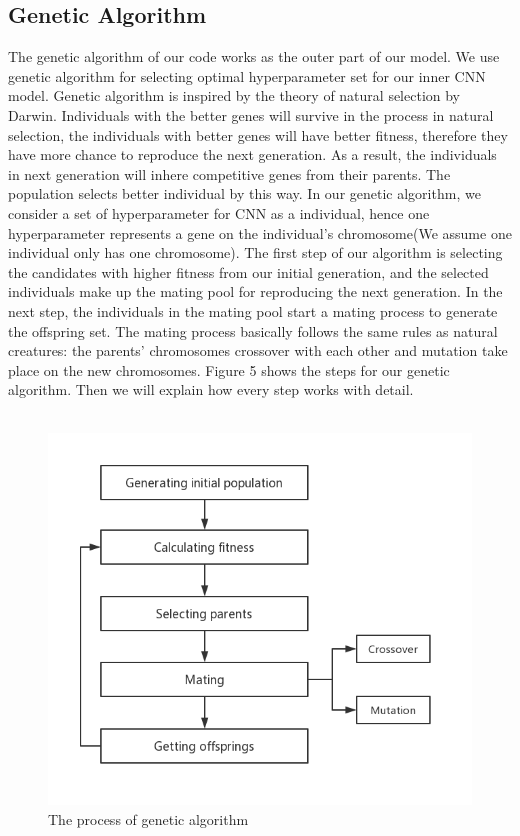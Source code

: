 \documentclass[12pt]{article}
\begin{document}
\subsection{Genetic Algorithm}
The genetic algorithm of our code works as the outer part of our model. We use genetic algorithm for selecting optimal hyperparameter set for our inner CNN model. Genetic algorithm is inspired by the theory of natural selection by Darwin. Individuals with the better genes will survive in the process in natural selection, the individuals with better genes will have better fitness, therefore they have more chance to reproduce the next generation. As a result, the individuals in next generation will inhere competitive genes from their parents. The population selects better individual by this way. In our genetic algorithm, we consider a set of hyperparameter for CNN as a individual, hence one hyperparameter represents a gene on the individual's chromosome(We assume one individual only has one chromosome). The first step of our algorithm is selecting the candidates with higher fitness from our initial generation, and the selected individuals make up the mating pool for reproducing the next generation. In the next step, the individuals in the mating pool start a mating process to generate the offspring set. The mating process basically follows the same rules as natural creatures: the parents' chromosomes crossover with each other and mutation take place on the new chromosomes. Figure 5 shows the steps for our genetic algorithm. Then we will explain how every step works with detail.\\
~\\
\begin{figure}
\begin{center}
\includegraphics[width =4.7in]{GA.png}
\caption{The process of genetic algorithm}
\end{center}
\label{fig:pic5}
\end{figure}
\end{document}
